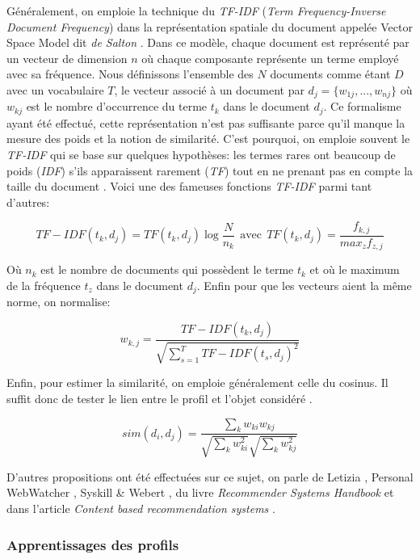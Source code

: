 Généralement, on emploie la technique du \textit{TF-IDF} (\textit{Term Frequency-Inverse Document Frequency}) dans la représentation spatiale du document appelée Vector Space Model dit \textit{de Salton} \cite{Salton:1975:VSM:361219.361220}. Dans ce modèle, chaque document est représenté par un vecteur de dimension $n$ où chaque composante représente un terme employé avec sa fréquence. Nous définissons l'ensemble des $N$ documents comme étant $D$ avec un vocabulaire $T$, le vecteur associé à un document par $d_{j} = \{ w_{1j}, ..., w_{nj} \}$ où $w_{kj}$ est le nombre d'occurrence du terme $t_{k}$ dans le document $d_{j}$. Ce formalisme ayant été effectué, cette représentation n'est pas suffisante parce qu'il manque la mesure des poids et la notion de similarité. C'est pourquoi, on emploie souvent le \textit{TF-IDF} qui se base sur quelques hypothèses: les termes rares ont beaucoup de poids (\textit{IDF}) s'ils apparaissent rarement (\textit{TF}) tout en ne prenant pas en compte la taille du document \cite{salton1989automatic}.
Voici une des fameuses fonctions \textit{TF-IDF} parmi tant d'autres:

$$ TF-IDF(t_{k}, d_{j}) = TF(t_{k}, d_{j}) \log \frac{N}{n_{k}} ~~ \text{avec} ~~ TF(t_{k}, d_{j}) = \frac{f_{k, j}}{max_{z}f_{z, j}} $$

Où $n_{k}$ est le nombre de documents qui possèdent le terme $t_{k}$ et où le maximum de la fréquence $t_{z}$ dans le document $d_{j}$. Enfin pour que les vecteurs aient la même norme, on normalise:

$$ w_{k, j} = \frac{ TF-IDF(t_{k}, d_{j}) }{ \sqrt{ \sum\nolimits_{s = 1}^{T} TF-IDF(t_{s}, d_{j})^{2} } } $$

Enfin, pour estimer la similarité, on emploie généralement celle du cosinus. Il suffit donc de tester le lien entre le profil et l'objet considéré \cite{sparck1972statistical}.

$$ sim(d_{i}, d_{j}) = \frac{ \sum\nolimits_{k} w_{ki}w_{kj}}{ \sqrt{ \sum\nolimits_{k} w_{ki}^{2} } \sqrt{ \sum\nolimits_{k} w_{kj}^{2} } } $$

D'autres propositions ont été effectuées sur ce sujet, on parle de Letizia \cite{lieberman1995letizia}, Personal WebWatcher \cite{mladenic1999machine}, Syskill \& Webert \cite{pazzani1996syskill}, du livre \textit{Recommender Systems Handbook} \cite{Ricci210} et dans l'article \textit{Content based recommendation systems} \cite{pazzani2007content}.

\subsubsection{Apprentissages des profils}


